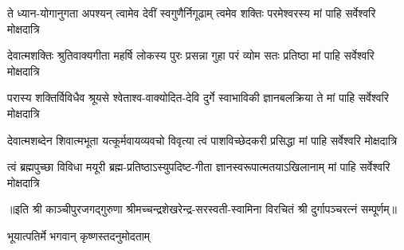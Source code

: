 

\fourlineindentedshloka
{ते ध्यान-योगानुगता अपश्यन्}
{त्वामेव देवीं स्वगुणैर्निगूढाम्}
{त्वमेव शक्तिः परमेश्वरस्य}
{मां पाहि सर्वेश्वरि मोक्षदात्रि}%

\fourlineindentedshloka
{देवात्मशक्तिः श्रुतिवाक्यगीता}
{महर्षि लोकस्य पुरः प्रसन्ना}
{गुहा परं व्योम सतः प्रतिष्ठा}
{मां पाहि सर्वेश्वरि मोक्षदात्रि}%

\fourlineindentedshloka
{परास्य शक्तिर्विविधैव श्रूयसे}
{श्वेताश्व-वाक्योदित-देवि दुर्गे}
{स्वाभाविकी ज्ञानबलक्रिया ते}
{मां पाहि सर्वेश्वरि मोक्षदात्रि}%

\fourlineindentedshloka
{देवात्मशब्देन शिवात्मभूता}
{यत्कूर्मवायव्यवचो विवृत्या}
{त्वं पाशविच्छेदकरी प्रसिद्धा}
{मां पाहि सर्वेश्वरि मोक्षदात्रि}%

\fourlineindentedshloka
{त्वं ब्रह्मपुच्छा विविधा मयूरी}
{ब्रह्म-प्रतिष्ठाऽस्युपदिष्ट-गीता}
{ज्ञानस्वरूपात्मतयाऽखिलानाम्}
{मां पाहि सर्वेश्वरि मोक्षदात्रि}%

{॥इति श्री काञ्चीपुरजगद्गुरुणा श्रीमच्चन्द्रशेखरेन्द्र-सरस्वती-स्वामिना विरचितं श्री दुर्गापञ्चरत्नं सम्पूर्णम्॥}

\closesection

{भूयात्पतिर्मे भगवान् कृष्णस्तदनुमोदताम्}
